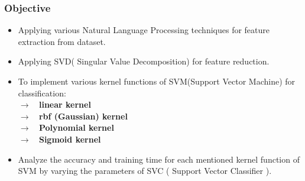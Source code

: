 \documentclass{beamer}
\newcommand\tab[1][1cm]{\hspace*{#1}}
\begin{document}
\begin{frame}
\frametitle{\tab \tab \tab \tab \quad \huge Objective}
\begin{itemize}
\item Applying various Natural Language Processing techniques for
feature extraction from dataset.\\
\item Applying SVD( Singular Value Decomposition) for feature reduction. \\
\item To implement various kernel functions of SVM(Support Vector
Machine) for classification: \\
\textbf{\tab $\rightarrow$ \ linear kernel \\}
\textbf{\tab $\rightarrow$ \ rbf (Gaussian) kernel \\}
\textbf{\tab $\rightarrow$ \ Polynomial kernel \\}
\textbf{\tab $\rightarrow$ \ Sigmoid kernel \\}
\item Analyze the accuracy and training time for each mentioned kernel function
of SVM by varying the parameters of SVC ( Support Vector Classifier ).
\end{itemize}
\end{frame}
\end{document}
